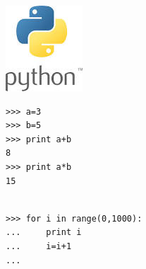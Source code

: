 \begin{center}
	\includegraphics[width=.2\linewidth]{./IMG/python.jpg}
\end{center}
%
%
%
%
%
%
%

\begin{lstlisting}
>>> a=3
>>> b=5
>>> print a+b
8
>>> print a*b
15
\end{lstlisting}

\begin{lstlisting}

>>> for i in range(0,1000):
...     print i
...     i=i+1
... 

\end{lstlisting}

\vfill\null
\pagebreak

